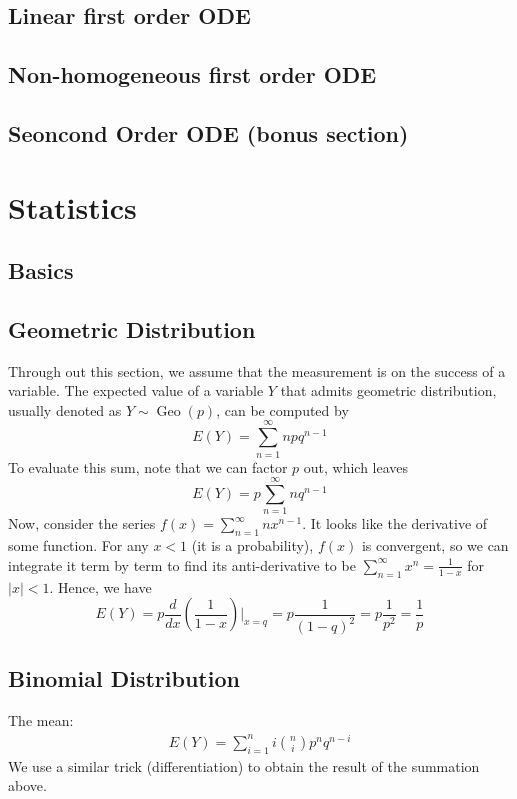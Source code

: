\documentclass{article}
\theoremstyle{definition}
\theoremstyle{definition}
\theoremstyle{definition}
\theoremstyle{definition}
\theoremstyle{definition}
\theoremstyle{definition}
\theoremstyle{definition}
\theoremstyle{definition}
\theoremstyle{definition}
\newcommand{\Geo}{\operatorname{Geo}}
\begin{document}
\subsection{Linear first order ODE}
\subsection{Non-homogeneous first order ODE}
\subsection{Seoncond Order ODE (bonus section)}

\section{Statistics}
\subsection{Basics}
\subsection{Geometric Distribution}
Through out this section, we assume that the measurement is on the success of a variable.
The expected value of a variable $Y$ that admits geometric distribution, usually denoted as $Y\sim \Geo(p)$, can be computed by
\[
E(Y)=\sum_{n=1}^\infty npq^{n-1}  
\]
To evaluate this sum, note that we can factor $p$ out, which leaves 
\[
E(Y)=p\sum_{n=1}^\infty nq^{n-1}    
\]
Now, consider the series $f(x)=\sum_{n=1}^\infty nx^{n-1}$. It looks like the derivative of some function. For any $x<1$ (it is a probability), $f(x)$ is convergent,
so we can integrate it term by term to find its anti-derivative to be $\sum_{n=1}^\infty x^n=\frac{1}{1-x}$ for $|x|<1$.
Hence, we have
\[
E(Y)=p\dfrac{d}{dx}\left(\dfrac{1}{1-x}\right)\Bigg|_{x=q}=p\dfrac{1}{(1-q)^2}=p\dfrac{1}{p^2}=\dfrac{1}{p}  
\]
\subsection{Binomial Distribution}
The mean:
\begin{align*}
    E(Y)=\sum_{i=1}^ni\binom{n}{i}p^nq^{n-i}
\end{align*}
We use a similar trick (differentiation) to obtain the result of the summation above.
\end{document}
